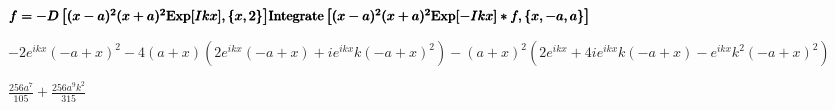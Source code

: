 \documentclass{article}
\begin{document}
\begin{doublespace}
\noindent\(\pmb{\text{}}\)
\end{doublespace}

\begin{doublespace}
\noindent\(\pmb{\text{}}\\
\pmb{f = -D\left[(x-a)^2 (x+a)^2 \text{Exp}[I k x],\{x,2\}\right]}\\
\pmb{\text{Integrate}\left[(x-a)^2 (x+a)^2 \text{Exp}[-I k x]* f,\{x,-a,a\}\right]}\)
\end{doublespace}

\begin{doublespace}
\noindent\(-2 e^{i k x} (-a+x)^2-4 (a+x) \left(2 e^{i k x} (-a+x)+i e^{i k x} k (-a+x)^2\right)-(a+x)^2 \left(2 e^{i k x}+4 i e^{i k x} k (-a+x)-e^{i
k x} k^2 (-a+x)^2\right)\)
\end{doublespace}

\begin{doublespace}
\noindent\(\frac{256 a^7}{105}+\frac{256 a^9 k^2}{315}\)
\end{doublespace}

\begin{doublespace}
\noindent\(\pmb{\text{}}\)
\end{doublespace}

\begin{doublespace}
\noindent\(\pmb{\text{}}\)
\end{doublespace}
\end{document}
